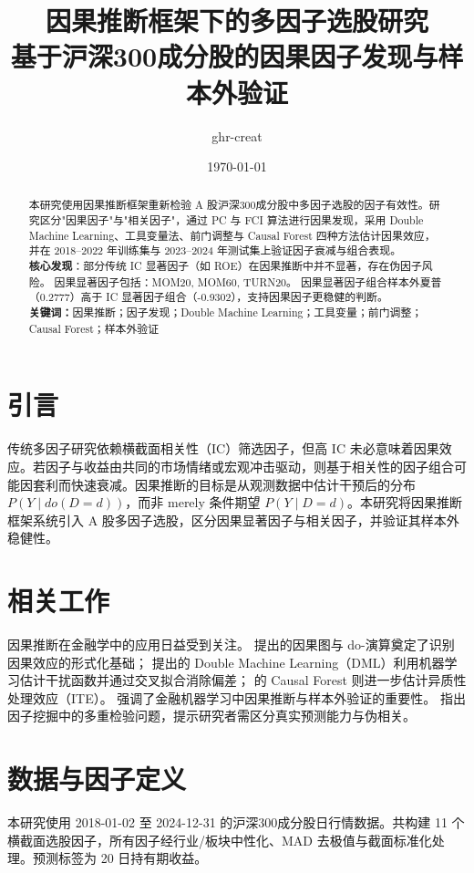 \documentclass[12pt,a4paper]{ctexart}
\title{\textbf{因果推断框架下的多因子选股研究}\\\large 基于沪深300成分股的因果因子发现与样本外验证}
\author{ghr-creat}
\date{\today}
\begin{document}
\maketitle

\begin{abstract}
\noindent 本研究使用因果推断框架重新检验 A 股沪深300成分股中多因子选股的因子有效性。研究区分"因果因子"与"相关因子"，通过 PC 与 FCI 算法进行因果发现，采用 Double Machine Learning、工具变量法、前门调整与 Causal Forest 四种方法估计因果效应，并在 2018--2022 年训练集与 2023--2024 年测试集上验证因子衰减与组合表现。\\[6pt]
\textbf{核心发现}：部分传统 IC 显著因子（如 ROE）在因果推断中并不显著，存在伪因子风险。 因果显著因子包括：MOM20, MOM60, TURN20。 因果显著因子组合样本外夏普（0.2777）高于 IC 显著因子组合（-0.9302），支持因果因子更稳健的判断。\\[6pt]
\noindent\textbf{关键词：}因果推断；因子发现；Double Machine Learning；工具变量；前门调整；Causal Forest；样本外验证
\end{abstract}

\tableofcontents
\newpage

\section{引言}
传统多因子研究依赖横截面相关性（IC）筛选因子，但高 IC 未必意味着因果效应。若因子与收益由共同的市场情绪或宏观冲击驱动，则基于相关性的因子组合可能因套利而快速衰减。因果推断的目标是从观测数据中估计干预后的分布 $P(Y\mid do(D=d))$，而非 merely 条件期望 $P(Y\mid D=d)$。本研究将因果推断框架系统引入 A 股多因子选股，区分因果显著因子与相关因子，并验证其样本外稳健性。

\section{相关工作}
因果推断在金融学中的应用日益受到关注。\cite{pearl2009causality} 提出的因果图与 do-演算奠定了识别因果效应的形式化基础；\cite{chernozhukov2018double} 提出的 Double Machine Learning（DML）利用机器学习估计干扰函数并通过交叉拟合消除偏差；\cite{wager2018estimation} 的 Causal Forest 则进一步估计异质性处理效应（ITE）。\cite{lopezdeprado2018advances} 强调了金融机器学习中因果推断与样本外验证的重要性。\cite{harvey2016and} 指出因子挖掘中的多重检验问题，提示研究者需区分真实预测能力与伪相关。

\section{数据与因子定义}
本研究使用 2018-01-02 至 2024-12-31 的沪深300成分股日行情数据。共构建 11 个横截面选股因子，所有因子经行业/板块中性化、MAD 去极值与截面标准化处理。预测标签为 20 日持有期收益。
\end{document}
